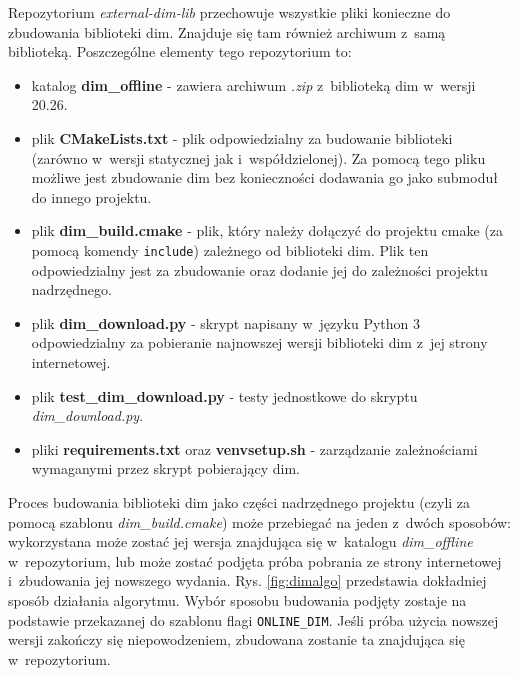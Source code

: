 Repozytorium \textit{external-dim-lib} przechowuje wszystkie pliki konieczne do zbudowania biblioteki \gls*{dim}. Znajduje się tam również archiwum z~samą biblioteką. Poszczególne elementy tego repozytorium to:
\begin{itemize}
\item katalog \textbf{dim\_offline} - zawiera archiwum \textit{.zip} z~biblioteką \gls*{dim} w~wersji 20.26.
\item plik \textbf{CMakeLists.txt} - plik odpowiedzialny za budowanie biblioteki (zarówno w~wersji statycznej jak i~współdzielonej). Za pomocą tego pliku możliwe jest zbudowanie \gls*{dim} bez konieczności dodawania go jako submoduł do innego projektu.
\item plik \textbf{dim\_build.cmake} - plik, który należy dołączyć do projektu \gls*{cmake} (za pomocą komendy \lstinline{include}) zależnego od biblioteki \gls*{dim}. Plik ten odpowiedzialny jest za zbudowanie oraz dodanie jej do zależności projektu nadrzędnego.
\item plik \textbf{dim\_download.py} - skrypt napisany w~języku Python 3 odpowiedzialny za pobieranie najnowszej wersji biblioteki \gls*{dim} z~jej strony internetowej.
\item plik \textbf{test\_dim\_download.py} - testy jednostkowe do skryptu \textit{dim\_download.py}.
\item pliki \textbf{requirements.txt} oraz \textbf{venvsetup.sh} - zarządzanie zależnościami wymaganymi przez skrypt pobierający \gls*{dim}.
\end{itemize}

Proces budowania biblioteki \gls*{dim} jako części nadrzędnego projektu (czyli za pomocą szablonu \textit{dim\_build.cmake}) może przebiegać na jeden z~dwóch sposobów: wykorzystana może zostać jej wersja znajdująca się w~katalogu \textit{dim\_offline} w~repozytorium, lub może zostać podjęta próba pobrania ze strony internetowej i~zbudowania jej nowszego wydania. Rys. \ref{fig:dimalgo} przedstawia dokładniej sposób działania algorytmu. Wybór sposobu budowania podjęty zostaje na podstawie przekazanej do szablonu flagi \lstinline{ONLINE_DIM}. Jeśli próba użycia nowszej wersji zakończy się niepowodzeniem, zbudowana zostanie ta znajdująca się w~repozytorium.

